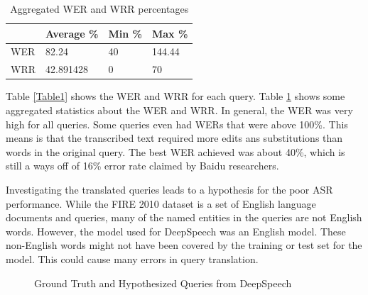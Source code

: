 \documentclass[jair, twoside,11pt,theapa]{article}
\begin{document}
\begin{table}
    \centering
    \caption{Aggregated WER and WRR percentages}
    \label{Table2}
    \begin{tabular}{|l|l|l|l|}
        \hline
                  & Average \%    & Min \%    & Max \%    \\ \hline
        WER       & 82.24       &  40     & 144.44  \\ \hline
        WRR       & 42.891428   & 0       & 70      \\ \hline
    \end{tabular}
\end{table}

Table \ref{Table1} shows the WER and WRR for each query. Table \ref{Table2} shows some aggregated statistics about the WER and WRR. In general, the WER was very high for all queries. Some queries even had WERs that were above 100\%. This means is that the transcribed text required more edits ans substitutions than words in the original query. The best WER achieved was about 40\%, which is still a ways off of 16\% error rate claimed by Baidu researchers. 

Investigating the translated queries leads to a hypothesis for the poor ASR performance. While the FIRE 2010 dataset is a set of English language documents and queries, many of the named entities in the queries are not English words. However, the model used for DeepSpeech was an English model. These non-English words might not have been covered by the training or test set for the model. This could cause many errors in query translation. 

\begin{figure}
    \centering
    \caption{Ground Truth and Hypothesized Queries from DeepSpeech}
    \label{query_Transcribe_fail}
\end{figure}
\end{document}
